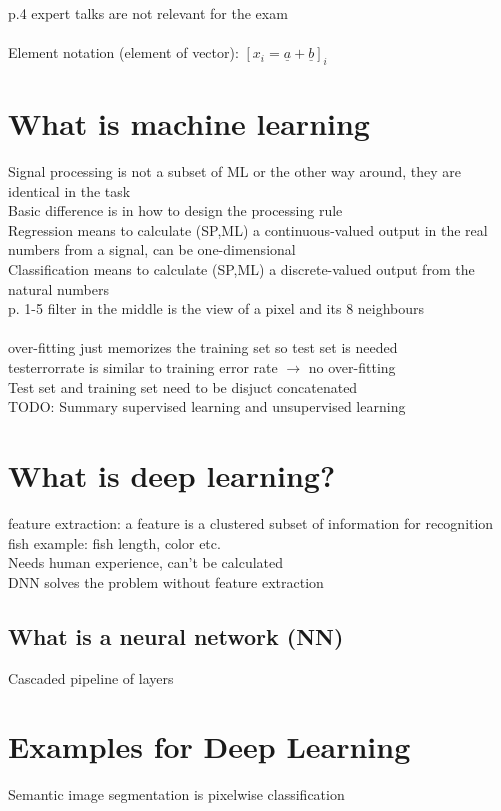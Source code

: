 \textbullet p.4 expert talks are not relevant for the exam \\
 \\
\textbullet Element notation (element of vector): $ [x_i = \underline{a} + \underline{b}]_i$
\section{What is machine learning}
\textbullet Signal processing is not a subset of ML or the other way around, they are identical in the task \\
\textbullet Basic difference is in how to design the processing rule \\
\textbullet Regression means to calculate (SP,ML) a continuous-valued output in the real numbers from a signal, can be one-dimensional \\
\textbullet Classification means to calculate (SP,ML) a discrete-valued output from the natural numbers \\
\textbullet p. 1-5 filter in the middle is the view of a pixel and its 8 neighbours \\
 \\
\textbullet over-fitting just memorizes the training set so test set is needed \\
\textbullet testerrorrate is similar to training error rate $\rightarrow$ no over-fitting \\
\textbullet Test set and training set need to be disjuct concatenated \\
\textbullet TODO: Summary supervised learning and unsupervised learning
\section{What is deep learning?}

\textbullet feature extraction: a feature is a clustered subset of information for recognition \\
\textbullet fish example: fish length, color etc. \\
\qquad \textbullet Needs human experience, can't be calculated \\
\qquad \textbullet DNN solves the problem without feature extraction
\subsection{What is a neural network (NN)}

\textbullet Cascaded pipeline of layers \\
\section{Examples for Deep Learning}
\textbullet Semantic image segmentation is pixelwise classification



